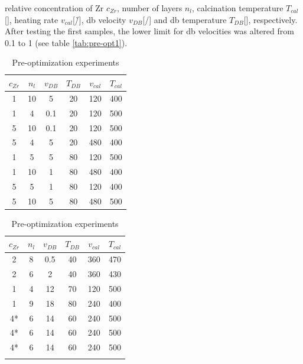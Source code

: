 relative concentration of Zr $c_{Zr}$, number of layers $n_{l}$, calcination temperature $T_{cal}$[\oc{}], heating rate $v_{cal}$[\oc{}/\h{}], \gls{db} velocity $v_{DB}$[\mm{}/\s{}] and \gls{db} temperature $T_{DB}$[\oc{}], respectively. 
After testing the first samples, the lower limit for \gls{db} velocities was altered from 0.1 to 1 (see table \ref{tab:pre-opt1}).
\begin{table}[hbt]
	\centering
	\caption{Pre-optimization experiments}
	\label{tab:pre-opt}
	\begin{subtable}{0.5\linewidth}
		\centering
		\label{tab:pre-opt1}
		\begin{tabular}{cccccc}
			\hline
			\hline
			$c_{Zr}$	&$n_l$	&$v_{DB}$	&$T_{DB}$	&$v_{cal}$	&$T_{cal}$		\\
			\hline
	1	&10	&5	&20	&120	&400	\\
	1	&4	&0.1	&20	&120	&500	\\
	5	&10	&0.1	&20	&120	&500	\\
	5	&4	&5	&20	&480	&400	\\
	1	&5	&5	&80	&120	&500	\\
	1	&10	&1	&80	&480	&400	\\
	5	&5	&1	&80	&120	&400	\\
	5	&10	&5	&80	&480	&500	\\
			\hline\hline
		\end{tabular}
	\end{subtable}%
	\begin{subtable}{0.5\linewidth}
		\centering
		\label{tab:pre-opt2}
		\begin{tabular}{cccccc}
			\hline\hline
			$c_{Zr}$	&$n_l$	&$v_{DB}$	&$T_{DB}$	&$v_{cal}$	&$T_{cal}$		\\
			\hline
	2	&8	&0.5	&40	&360	&470	\\
	2	&6	&2	&40	&360	&430	\\
	1	&4	&12	&70	&120	&500	\\
	1	&9	&18	&80	&240	&400	\\
	4*	&6	&14	&60	&240	&500	\\
	4*	&6	&14	&60	&240	&500	\\
	4*	&6	&14	&60	&240	&500	\\
			\hline
			\hline
			\\
		\end{tabular}
	\end{subtable}
\end{table}

